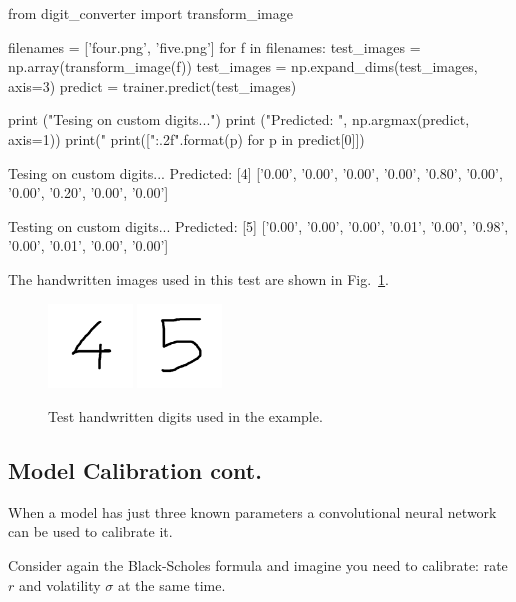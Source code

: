 \begin{ipython}
from digit_converter import transform_image

filenames = ['four.png', 'five.png']
for f in filenames:
    test_images = np.array(transform_image(f))
test_images = np.expand_dims(test_images, axis=3)
predict = trainer.predict(test_images)

print ("Tesing on custom digits...")
print ("Predicted: ", np.argmax(predict, axis=1))
print("%
print(["{:.2f}".format(p) for p in predict[0]])
\end{ipython}
\begin{ioutput}
Tesing on custom digits...
Predicted:  [4]
['0.00', '0.00', '0.00', '0.00', '0.80', '0.00', '0.00', '0.20', '0.00', '0.00']

Testing on custom digits...
Predicted:  [5]
['0.00', '0.00', '0.00', '0.01', '0.00', '0.98', '0.00', '0.01', '0.00', '0.00']
\end{ioutput}
The handwritten images used in this test are shown in Fig.~\ref{fig:test_images}.

\begin{figure}[htb]
	\centering
	\includegraphics[width=0.2\textwidth]{figures/four.png}
	\includegraphics[width=0.2\textwidth]{figures/five.png}
	\caption{Test handwritten digits used in the example.}
	\label{fig:test_images}
\end{figure}

\subsection{Model Calibration cont.}
\label{model-calibration-cont.}

When a model has just three known parameters a convolutional neural network can be used to calibrate it.

Consider again the Black-Scholes formula and imagine you need to calibrate: rate $r$ and volatility $\sigma$ at the same time.

